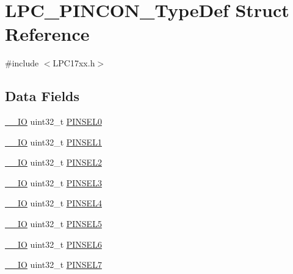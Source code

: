\hypertarget{structLPC__PINCON__TypeDef}{}\section{L\+P\+C\+\_\+\+P\+I\+N\+C\+O\+N\+\_\+\+Type\+Def Struct Reference}
\label{structLPC__PINCON__TypeDef}


{\ttfamily \#include $<$L\+P\+C17xx.\+h$>$}

\subsection*{Data Fields}
\begin{DoxyCompactItemize}
\item 
\hyperlink{LPC17xx_8h_aec43007d9998a0a0e01faede4133d6be}{\+\_\+\+\_\+\+IO} uint32\+\_\+t \hyperlink{structLPC__PINCON__TypeDef_a5ec930a00f9376c448cb67b83b5eacb7}{P\+I\+N\+S\+E\+L0}
\item 
\hyperlink{LPC17xx_8h_aec43007d9998a0a0e01faede4133d6be}{\+\_\+\+\_\+\+IO} uint32\+\_\+t \hyperlink{structLPC__PINCON__TypeDef_a254f1753d52956a4cb0dda0ea40ca401}{P\+I\+N\+S\+E\+L1}
\item 
\hyperlink{LPC17xx_8h_aec43007d9998a0a0e01faede4133d6be}{\+\_\+\+\_\+\+IO} uint32\+\_\+t \hyperlink{structLPC__PINCON__TypeDef_ae6aaae54118c25b1c093b2895c5a7b99}{P\+I\+N\+S\+E\+L2}
\item 
\hyperlink{LPC17xx_8h_aec43007d9998a0a0e01faede4133d6be}{\+\_\+\+\_\+\+IO} uint32\+\_\+t \hyperlink{structLPC__PINCON__TypeDef_a8bc76a2cb0120314a2e57c0b54c642c2}{P\+I\+N\+S\+E\+L3}
\item 
\hyperlink{LPC17xx_8h_aec43007d9998a0a0e01faede4133d6be}{\+\_\+\+\_\+\+IO} uint32\+\_\+t \hyperlink{structLPC__PINCON__TypeDef_afe20ffbd71706b874785b1ed434b36f5}{P\+I\+N\+S\+E\+L4}
\item 
\hyperlink{LPC17xx_8h_aec43007d9998a0a0e01faede4133d6be}{\+\_\+\+\_\+\+IO} uint32\+\_\+t \hyperlink{structLPC__PINCON__TypeDef_a54ff6d15e65f3d6c27d9291b8735a4d2}{P\+I\+N\+S\+E\+L5}
\item 
\hyperlink{LPC17xx_8h_aec43007d9998a0a0e01faede4133d6be}{\+\_\+\+\_\+\+IO} uint32\+\_\+t \hyperlink{structLPC__PINCON__TypeDef_ad8736d6ea846fe3fb4e581b457503853}{P\+I\+N\+S\+E\+L6}
\item 
\hyperlink{LPC17xx_8h_aec43007d9998a0a0e01faede4133d6be}{\+\_\+\+\_\+\+IO} uint32\+\_\+t \hyperlink{structLPC__PINCON__TypeDef_a489b3e47c08fb0ef5a3c40ab7c3945a3}{P\+I\+N\+S\+E\+L7}

\end{DoxyCompactItemize}
